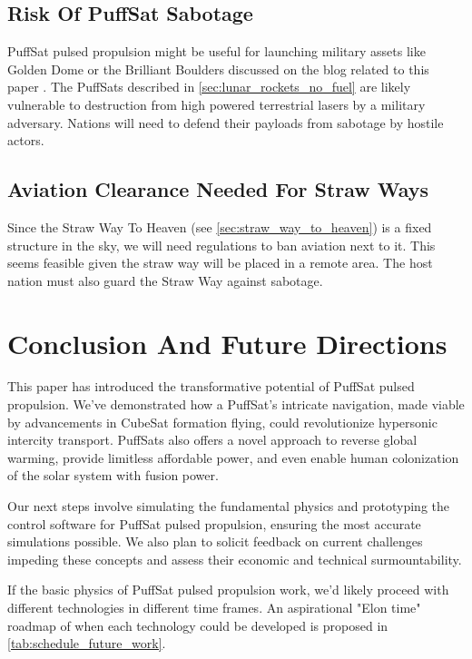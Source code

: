 \documentclass{article}
\begin{document}
\subsection{Risk Of PuffSat Sabotage}
PuffSat pulsed propulsion might be useful for launching military assets like Golden Dome \cite{lockheed_martin_golden_dome} or the Brilliant Boulders \cite{brilliant_boulders} discussed on the blog related to this paper \cite{aim2024}.   The PuffSats described in \autoref{sec:lunar_rockets_no_fuel} are likely vulnerable to destruction from high powered terrestrial lasers by a military adversary.  Nations will need to defend their payloads from sabotage by hostile actors.

\subsection{Aviation Clearance Needed For Straw Ways}
Since the Straw Way To Heaven (see \autoref{sec:straw_way_to_heaven}) is a fixed structure in the sky, we will need regulations to ban aviation next to it.   This seems feasible given the straw way will be placed in a remote area.   The host nation must also guard the Straw Way against sabotage.


\section{Conclusion And Future Directions}
This paper has introduced the transformative potential of PuffSat pulsed propulsion. We've demonstrated how a PuffSat's intricate navigation, made viable by advancements in CubeSat formation flying, could revolutionize hypersonic intercity transport.  PuffSats also offers a novel approach to reverse global warming, provide limitless affordable power, and even enable human colonization of the solar system with fusion power. 

Our next steps involve simulating the fundamental physics and prototyping the control software for PuffSat pulsed propulsion, ensuring the most accurate simulations possible. We also plan to solicit feedback on current challenges impeding these concepts and assess their economic and technical surmountability.

If the basic physics of PuffSat pulsed propulsion work, we'd likely proceed with different technologies in different time frames.  An aspirational "Elon time" \cite{wiktionary_elon_time} roadmap of when each technology could be  developed is proposed in \autoref{tab:schedule_future_work}.
\end{document}
